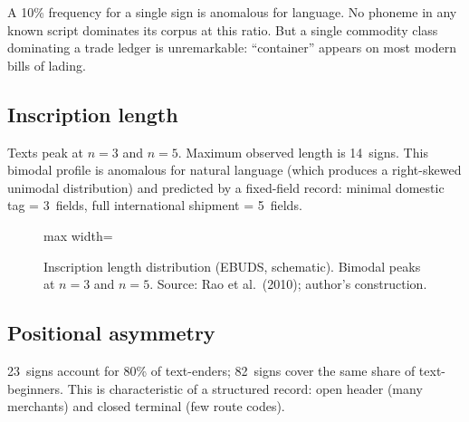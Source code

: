 A 10\% frequency for a single sign is anomalous for language.
No phoneme in any known script dominates its corpus at this ratio.
But a single commodity class dominating a trade ledger is
unremarkable: ``container'' appears on most modern bills of lading.

\subsection{Inscription length}

Texts peak at $n=3$ and $n=5$.\smartcite{Rao2010}
Maximum observed length is 14~signs.
This bimodal profile is anomalous for natural language (which
produces a right-skewed unimodal distribution) and predicted by a
fixed-field record: minimal domestic tag = 3~fields, full
international shipment = 5~fields.

\begin{figure}[ht]
\centering
\begin{adjustbox}{max width=\linewidth}
\end{adjustbox}
\caption{Inscription length distribution (EBUDS, schematic).
Bimodal peaks at $n=3$ and $n=5$.
Source: Rao et al.\ (2010); author's construction.}
\label{fig:textlen}
\end{figure}

\subsection{Positional asymmetry}

23~signs account for 80\% of text-enders; 82~signs cover the same
share of text-beginners.\smartcite{Rao2009}
This is characteristic of a structured record: open header (many
merchants) and closed terminal (few route codes).

